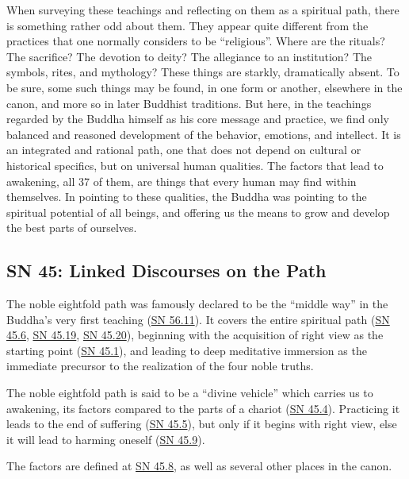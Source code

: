 \documentclass[12pt,openany]{book}%
\begin{document}
When surveying these teachings and reflecting on them as a spiritual path, there is something rather odd about them. They appear quite different from the practices that one normally considers to be “religious”. Where are the rituals? The sacrifice? The devotion to deity? The allegiance to an institution? The symbols, rites, and mythology? These things are starkly, dramatically absent. To be sure, some such things may be found, in one form or another, elsewhere in the canon, and more so in later Buddhist traditions. But here, in the teachings regarded by the Buddha himself as his core message and practice, we find only balanced and reasoned development of the behavior, emotions, and intellect. It is an integrated and rational path, one that does not depend on cultural or historical specifics, but on universal human qualities. The factors that lead to awakening, all 37 of them, are things that every human may find within themselves. In pointing to these qualities, the Buddha was pointing to the spiritual potential of all beings, and offering us the means to grow and develop the best parts of ourselves.

\subsection*{SN 45: Linked Discourses on the Path}

The noble eightfold path was famously declared to be the “middle way” in the Buddha’s very first teaching (\href{https://suttacentral.net/sn56.11}{SN 56.11}). It covers the entire spiritual path (\href{https://suttacentral.net/sn45.6}{SN 45.6}, \href{https://suttacentral.net/sn45.19}{SN 45.19}, \href{https://suttacentral.net/sn45.20}{SN 45.20}), beginning with the acquisition of right view as the starting point (\href{https://suttacentral.net/sn45.1}{SN 45.1}), and leading to deep meditative immersion as the immediate precursor to the realization of the four noble truths.

The noble eightfold path is said to be a “divine vehicle” which carries us to awakening, its factors compared to the parts of a chariot (\href{https://suttacentral.net/sn45.4}{SN 45.4}). Practicing it leads to the end of suffering (\href{https://suttacentral.net/sn45.5}{SN 45.5}), but only if it begins with right view, else it will lead to harming oneself (\href{https://suttacentral.net/sn45.9}{SN 45.9}).

The factors are defined at \href{https://suttacentral.net/sn45.8}{SN 45.8}, as well as several other places in the canon.
\end{document}
